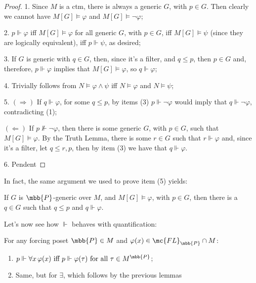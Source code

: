 \begin{proof}
    1. Since $M$ is a ctm, there is always a generic $G$, with $p\in G$. Then clearly we cannot have $M[G]\vDash\varphi$ and $M[G]\vDash\neg\varphi$;

    2. $p\Vdash\varphi$ iff $M[G]\vDash\varphi$ for all generic $G$, with $p\in G$, iff $M[G]\vDash\psi$ (since they are logically equivalent), iff $p\Vdash\psi$, as desired;

    3. If $G$ is generic with $q\in G$, then, since it's a filter, and $q\leq p$, then $p\in G$ and, therefore, $p\Vdash\varphi$ implies that $M[G]\vDash\varphi$, so $q\Vdash\varphi$;

    4. Trivially follows from $N\vDash\varphi\wedge\psi$ iff $N\vDash\varphi$ and $N\vDash\psi$;

    5. $(\Rightarrow)$ If $q\Vdash\varphi$, for some $q\leq p$, by items (3) $p\Vdash\neg\varphi$ would imply that $q\Vdash\neg\varphi$, contradicting (1);

    $(\Leftarrow)$ If $p\nVdash\neg\varphi$, then there is some generic $G$, with $p\in G$, such that $M[G]\vDash\varphi$. By the Truth Lemma, there is some $r\in G$ such that $r\Vdash\varphi$ and, since it's a filter, let $q\leq r,p$, then by item (3) we have that $q\Vdash\varphi$.

    6. \textcolor{laser_eyes}{Pendent}
\end{proof}

In fact, the same argument we used to prove item (5) yields:

\begin{lemma}{}{}\label{q<=p_q_Vdash_phi}
    If $G$ is $\mbb{P}$-generic over $M$, and $M[G]\vDash\varphi$, with $p\in G$, then there is a $q\in G$ such that $q\leq p$ and $q\Vdash\varphi$.
\end{lemma}

Let's now see how $\Vdash$ behaves with quantification:

\begin{lemma}{}{}
    For any forcing poset $\mbb{P}\in M$ and $\varphi(x)\in\mc{FL}_{\mbb{P}}\cap M$:
    \begin{enumerate}
        \item $p\Vdash\forall x\,\varphi(x)\text{ iff }p\Vdash\varphi(\tau)\text{ for all }\tau\in M^{\mbb{P}}$;
        \item \textcolor{laser_eyes}{Same, but for $\exists$, which follows by the previous lemmas}
    \end{enumerate}
\end{lemma}

